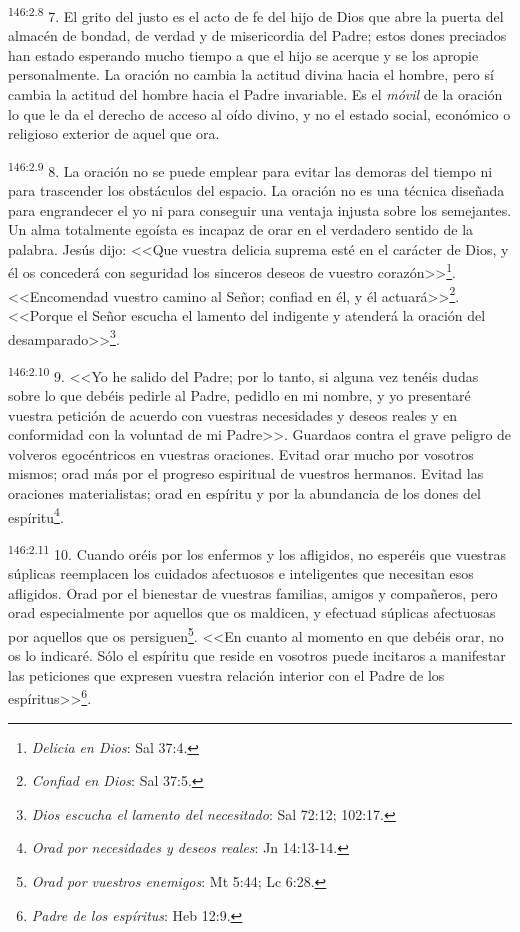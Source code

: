 \par 
\textsuperscript{146:2.8} 7. El grito del justo es el acto de fe del hijo de Dios que abre la puerta del almacén de bondad, de verdad y de misericordia del Padre; estos dones preciados han estado esperando mucho tiempo a que el hijo se acerque y se los apropie personalmente. La oración no cambia la actitud divina hacia el hombre, pero sí cambia la actitud del hombre hacia el Padre invariable. Es el \textit{móvil} de la oración lo que le da el derecho de acceso al oído divino, y no el estado social, económico o religioso exterior de aquel que ora.

\par 
\textsuperscript{146:2.9} 8. La oración no se puede emplear para evitar las demoras del tiempo ni para trascender los obstáculos del espacio. La oración no es una técnica diseñada para engrandecer el yo ni para conseguir una ventaja injusta sobre los semejantes. Un alma totalmente egoísta es incapaz de orar en el verdadero sentido de la palabra. Jesús dijo: <<Que vuestra delicia suprema esté en el carácter de Dios, y él os concederá con seguridad los sinceros deseos de vuestro corazón>>\footnote{\textit{Delicia en Dios}: Sal 37:4.}. <<Encomendad vuestro camino al Señor; confiad en él, y él actuará>>\footnote{\textit{Confiad en Dios}: Sal 37:5.}. <<Porque el Señor escucha el lamento del indigente y atenderá la oración del desamparado>>\footnote{\textit{Dios escucha el lamento del necesitado}: Sal 72:12; 102:17.}.

\par 
\textsuperscript{146:2.10} 9. <<Yo he salido del Padre; por lo tanto, si alguna vez tenéis dudas sobre lo que debéis pedirle al Padre, pedidlo en mi nombre, y yo presentaré vuestra petición de acuerdo con vuestras necesidades y deseos reales y en conformidad con la voluntad de mi Padre>>. Guardaos contra el grave peligro de volveros egocéntricos en vuestras oraciones. Evitad orar mucho por vosotros mismos; orad más por el progreso espiritual de vuestros hermanos. Evitad las oraciones materialistas; orad en espíritu y por la abundancia de los dones del espíritu\footnote{\textit{Orad por necesidades y deseos reales}: Jn 14:13-14.}.

\par 
\textsuperscript{146:2.11} 10. Cuando oréis por los enfermos y los afligidos, no esperéis que vuestras súplicas reemplacen los cuidados afectuosos e inteligentes que necesitan esos afligidos. Orad por el bienestar de vuestras familias, amigos y compañeros, pero orad especialmente por aquellos que os maldicen, y efectuad súplicas afectuosas por aquellos que os persiguen\footnote{\textit{Orad por vuestros enemigos}: Mt 5:44; Lc 6:28.}. <<En cuanto al momento en que debéis orar, no os lo indicaré. Sólo el espíritu que reside en vosotros puede incitaros a manifestar las peticiones que expresen vuestra relación interior con el Padre de los espíritus>>\footnote{\textit{Padre de los espíritus}: Heb 12:9.}.

